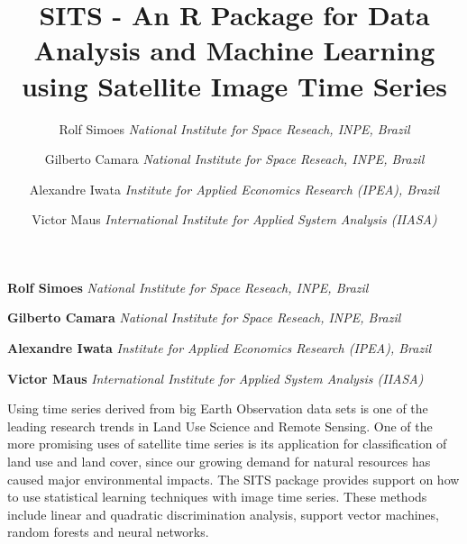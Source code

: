 \documentclass[11pt,]{article}
\title{SITS - An R Package for Data Analysis and Machine Learning using
Satellite Image Time Series  }
\author{\Large Rolf Simoes\vspace{0.05in} \newline\normalsize\emph{National Institute for Space Reseach, INPE, Brazil}   \and \Large Gilberto Camara\vspace{0.05in} \newline\normalsize\emph{National Institute for Space Reseach, INPE, Brazil}   \and \Large Alexandre Iwata\vspace{0.05in} \newline\normalsize\emph{Institute for Applied Economics Research (IPEA), Brazil}   \and \Large Victor Maus\vspace{0.05in} \newline\normalsize\emph{International Institute for Applied System Analysis (IIASA)}  }
\date{}
\newcommand*{\authorfont}{\fontfamily{phv}\selectfont}
\renewenvironment{abstract}
 {{%
    \setlength{\leftmargin}{0mm}
    \setlength{\rightmargin}{\leftmargin}%
  }%
  \relax}
 {\endlist}
\begin{document}
%

{%
\setlength{\parindent}{0pt}
\thispagestyle{plain}
{\fontsize{18}{20}\selectfont\raggedright
\maketitle  %

}

{
   \vskip 13.5pt\relax \normalsize\fontsize{11}{12}
\textbf{\authorfont Rolf Simoes} \hskip 15pt \emph{\small National Institute for Space Reseach, INPE, Brazil}   \par \textbf{\authorfont Gilberto Camara} \hskip 15pt \emph{\small National Institute for Space Reseach, INPE, Brazil}   \par \textbf{\authorfont Alexandre Iwata} \hskip 15pt \emph{\small Institute for Applied Economics Research (IPEA), Brazil}   \par \textbf{\authorfont Victor Maus} \hskip 15pt \emph{\small International Institute for Applied System Analysis (IIASA)}   

}

}








\begin{abstract}

    \hbox{\vrule height .2pt width 39.14pc}

    \vskip 8.5pt %

\noindent Using time series derived from big Earth Observation data sets is one of
the leading research trends in Land Use Science and Remote Sensing. One
of the more promising uses of satellite time series is its application
for classification of land use and land cover, since our growing demand
for natural resources has caused major environmental impacts. The SITS
package provides support on how to use statistical learning techniques
with image time series. These methods include linear and quadratic
discrimination analysis, support vector machines, random forests and
neural networks.


    \hbox{\vrule height .2pt width 39.14pc}


\end{abstract}
\end{document}
